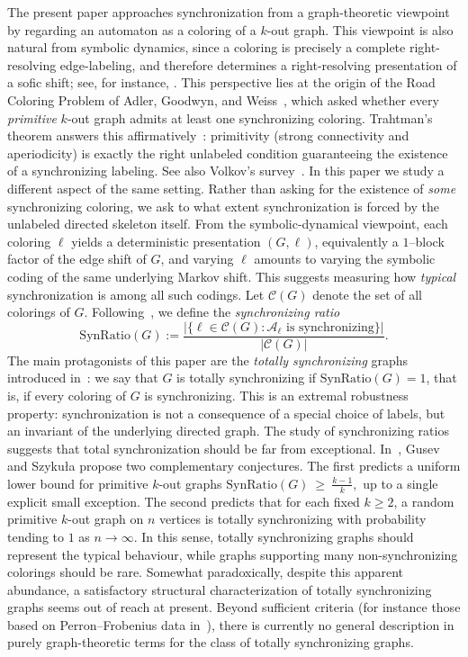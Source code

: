 \documentclass[a4paper,10pt]{amsart}
\theoremstyle{plain}
\theoremstyle{definition}
\begin{document}
The present paper approaches synchronization from a graph-theoretic viewpoint by regarding an automaton as a coloring of a $k$-out graph. This viewpoint is also natural from symbolic dynamics, since a coloring is precisely a complete right-resolving edge-labeling, and therefore determines a right-resolving presentation of a sofic shift; see, for instance, \cite{LM}. This perspective lies at the origin of the Road Coloring Problem of Adler, Goodwyn, and Weiss~\cite{adler1977}, which asked whether every \emph{primitive} $k$-out graph admits at least one synchronizing coloring. Trahtman’s theorem answers this affirmatively~\cite{trahtman2009}: primitivity (strong connectivity and aperiodicity) is exactly the right unlabeled condition guaranteeing the existence of a synchronizing labeling. See also Volkov’s survey~\cite{volkov2008}. In this paper we study a different aspect of the same setting. Rather than asking for the existence of \emph{some} synchronizing coloring, we ask to what extent synchronization is forced by the unlabeled directed skeleton itself. From the symbolic-dynamical viewpoint, each coloring $\ell$ yields a deterministic presentation $(G,\ell)$, equivalently a $1$--block factor of the edge shift of $G$, and varying $\ell$ amounts to varying the symbolic coding of the same underlying Markov shift. This suggests measuring how \emph{typical} synchronization is among all such codings. Let $\mathcal C(G)$ denote the set of all colorings of $G$. Following~\cite{GusevSzykula15}, we define the \emph{synchronizing ratio}
\[
\mathrm{SynRatio}(G)
:=
\frac{\bigl|\{\ell\in\mathcal C(G):\mathcal A_\ell\text{ is synchronizing}\}\bigr|}{|\mathcal C(G)|}.
\]
The main protagonists of this paper are the \emph{totally synchronizing} graphs introduced in~\cite{GusevSzykula15}: we say that $G$ is totally synchronizing if $\mathrm{SynRatio}(G)=1$, that is, if every coloring of $G$ is synchronizing. This is an extremal robustness property: synchronization is not a consequence of a special choice of labels, but an invariant of the underlying directed graph. The study of synchronizing ratios suggests that total synchronization should be far from exceptional. In~\cite{GusevSzykula15}, Gusev and Szyku{\l}a propose two complementary conjectures. The first predicts a uniform lower bound for primitive $k$-out graphs $\mathrm{SynRatio}(G)\ \ge\ \frac{k-1}{k},$ up to a single explicit small exception. The second predicts that for each fixed $k\ge 2$, a random primitive $k$-out graph on $n$ vertices is totally synchronizing with probability tending to $1$ as $n\to\infty$. In this sense, totally synchronizing graphs should represent the typical behaviour, while graphs supporting many non-synchronizing colorings should be rare. Somewhat paradoxically, despite this apparent abundance, a satisfactory structural characterization of totally synchronizing graphs seems out of reach at present.  Beyond sufficient criteria (for instance those based on Perron--Frobenius data in~\cite{GuPri}), there is currently no general description in purely graph-theoretic terms for the class of totally synchronizing graphs.
\end{document}
